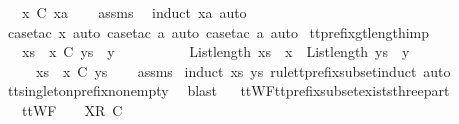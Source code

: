 \begin{isabellebody}
\ \ \ {\isachardoublequoteopen}{\isacharbrackleft}x{\isacharbrackright}\ {\isasymlesssim}\isactrlsub C\ xa{\isachardoublequoteclose}\isanewline
%
\isadelimproof
\ \ %
\endisadelimproof
%
\isatagproof
{}\isamarkupfalse%
\ assms\ \isamarkupfalse%
\ {\isacharparenleft}induct\ xa{\isacharcomma}\ auto{\isacharparenright}\isanewline
\ \ \isamarkupfalse%
\ {\isacharparenleft}case{\isacharunderscore}tac\ x{\isacharcomma}\ auto{\isacharcomma}\ case{\isacharunderscore}tac\ a{\isacharcomma}\ auto{\isacharcomma}\ case{\isacharunderscore}tac\ a{\isacharcomma}\ auto{\isacharparenright}%
\endisatagproof
{\isafoldproof}%
%
\isadelimproof
\isanewline
%
\endisadelimproof
\isanewline
{}\isamarkupfalse%
\ tt{\isacharunderscore}prefix{\isacharunderscore}gt{\isacharunderscore}length{\isacharunderscore}imp{\isacharcolon}\isanewline
\ \ \ {\isachardoublequoteopen}xs\ {\isacharat}\ {\isacharbrackleft}x{\isacharbrackright}\ {\isasymlesssim}\isactrlsub C\ ys\ {\isacharat}\ {\isacharbrackleft}y{\isacharbrackright}{\isachardoublequoteclose}\isanewline
\ \ \ \ \ \ \ \ \ \ {\isachardoublequoteopen}List{\isachardot}length\ {\isacharparenleft}xs\ {\isacharat}\ {\isacharbrackleft}x{\isacharbrackright}{\isacharparenright}\ {\isacharless}\ List{\isachardot}length\ {\isacharparenleft}ys\ {\isacharat}\ {\isacharbrackleft}y{\isacharbrackright}{\isacharparenright}{\isachardoublequoteclose}\isanewline
\ \ \ \ \ {\isachardoublequoteopen}xs\ {\isacharat}\ {\isacharbrackleft}x{\isacharbrackright}\ {\isasymlesssim}\isactrlsub C\ ys{\isachardoublequoteclose}\isanewline
%
\isadelimproof
\ \ %
\endisadelimproof
%
\isatagproof
{}\isamarkupfalse%
\ assms\ \isamarkupfalse%
{\isacharparenleft}induct\ xs\ ys\ rule{\isacharcolon}tt{\isacharunderscore}prefix{\isacharunderscore}subset{\isachardot}induct{\isacharcomma}\ auto{\isacharparenright}\isanewline
\ \ \isamarkupfalse%
\ tt{\isacharunderscore}singleton{\isacharunderscore}prefix{\isacharunderscore}nonempty\ \isamarkupfalse%
\ blast%
\endisatagproof
{\isafoldproof}%
%
\isadelimproof
\ \isanewline
%
\endisadelimproof
\isanewline
{}\isamarkupfalse%
\ ttWF{\isacharunderscore}tt{\isacharunderscore}prefix{\isacharunderscore}subset{\isacharunderscore}exists{\isacharunderscore}three{\isacharunderscore}part{\isacharcolon}\isanewline
\ \ \ {\isachardoublequoteopen}ttWF\ {\isasymsigma}{\isachardoublequoteclose}\ {\isachardoublequoteopen}{\isasymrho}\ {\isacharat}\ {\isacharbrackleft}{\isacharbrackleft}X{\isacharbrackright}\isactrlsub R{\isacharbrackright}\ {\isasymlesssim}\isactrlsub C\ {\isasymsigma}{\isachardoublequoteclose}\isanewline

\end{isabellebody}
